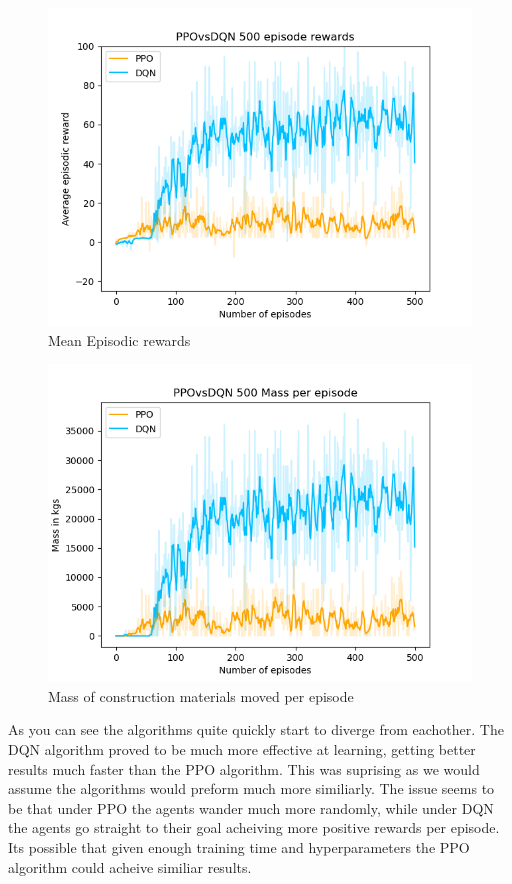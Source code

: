 \documentclass[conference]{IEEEtran}
\begin{document}
\begin{figure}[h!]
	\includegraphics[width=\columnwidth]{graphs/PPOvsDQN500rews.png}
	\caption{Mean Episodic rewards}
\end{figure}
\begin{figure}[h!]
	\includegraphics[width=\columnwidth]{graphs/PPOvsDQN500mass.png}
	\caption{Mass of construction materials moved per episode}
\end{figure}

As you can see the algorithms quite quickly start to diverge from eachother. The DQN algorithm proved to
be much more effective at learning, getting better results much faster than the PPO algorithm.
This was suprising as we would assume the algorithms would preform much more similiarly.
The issue seems to be that under PPO the agents wander much more randomly, while under DQN the agents go
straight to their goal acheiving more positive rewards per episode. Its possible that given enough training time and hyperparameters the PPO algorithm could acheive similiar results.
\end{document}
